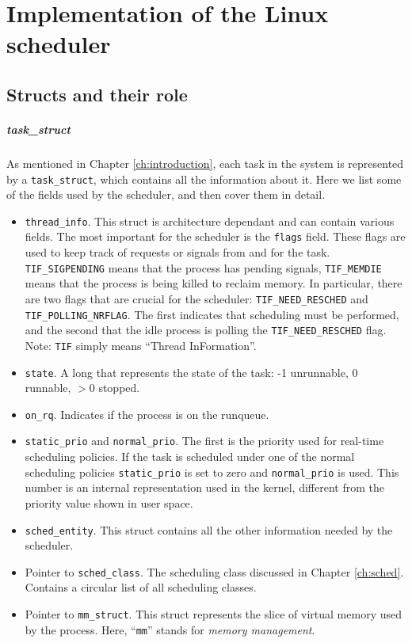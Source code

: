 \chapter{Implementation of the Linux scheduler}
\label{chap:implementation}

\section{Structs and their role}

\paragraph{task\_struct}
As mentioned in Chapter \ref{ch:introduction}, each task in the system is represented \newline by a \verb|task_struct|, which contains all the information about it. Here we list some of the fields used by the scheduler, and then cover them in detail.
\begin{itemize}
    \item \verb|thread_info|. This struct is architecture dependant and can contain various fields. The most important for the scheduler is the \verb|flags| field. These flags are used to keep track of requests or signals from and for the task. \verb|TIF_SIGPENDING| means that the process has pending signals, \verb|TIF_MEMDIE| means that the process is being killed to reclaim memory. In particular, there are two flags that are crucial for the scheduler: \verb|TIF_NEED_RESCHED| and \verb|TIF_POLLING_NRFLAG|. The first indicates that scheduling must be performed, and the second that the idle process is polling the \verb|TIF_NEED_RESCHED| flag. Note: \verb|TIF| simply means ``Thread InFormation''.
    \item \verb|state|. A long that represents the state of the task: -1 unrunnable, 0 runnable, $>0$ stopped. 
    \item \verb|on_rq|. Indicates if the process is on the runqueue.
    \item \verb|static_prio| and \verb|normal_prio|. The first is the priority used for real-time scheduling policies. If the task is scheduled under one of the normal scheduling policies \verb|static_prio| is set to zero and \verb|normal_prio| is used. This number is an internal representation used in the kernel, different from the priority value shown in user space.
    \item \verb|sched_entity|. This struct contains all the other information needed by the scheduler.
    \item Pointer to \verb|sched_class|. The scheduling class discussed in Chapter \ref{ch:sched}. Contains a circular list of all scheduling classes.
    \item Pointer to \verb|mm_struct|. This struct represents the slice of virtual memory used by the process. Here, ``\verb|mm|'' stands for \textit{memory management}.
\end{itemize}

